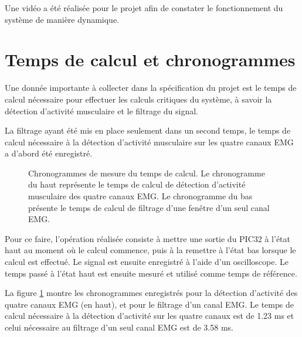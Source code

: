 \documentclass[letterpaper, twoside, 12pt, memoire, creativecommons, hyperref]{thETS}
\begin{document}
Une vidéo a été réalisée pour le projet afin de constater le fonctionnement du système de manière dynamique.

\section{Temps de calcul et chronogrammes}

Une donnée importante à collecter dans la spécification du projet est le temps de calcul nécessaire pour effectuer les calculs critiques du système, à savoir la détection d'activité musculaire et le filtrage du signal.

La filtrage ayant été mis en place seulement dans un second temps, le temps de calcul nécessaire à la détection d'activité musculaire sur les quatre canaux EMG a d'abord été enregistré. 

\begin{figure}
	\centering
	\caption{Chronogrammes de mesure du temps de calcul. Le chronogramme du haut représente le temps de calcul de détection d'activité musculaire des quatre canaux EMG. Le chronogramme du bas présente le temps de calcul de filtrage d'une fenêtre d'un seul canal EMG.}
	\label{fig:chronogrammes}
\end{figure}

Pour ce faire, l'opération réalisée consiste à mettre une sortie du PIC32 à l'état haut au moment où le calcul commence, puis à la remettre à l'état bas lorsque le calcul est effectué. Le signal est ensuite enregistré à l'aide d'un oscilloscope. Le temps passé à l'état haut est ensuite mesuré et utilisé comme temps de référence. 

La figure \ref{fig:chronogrammes} montre les chronogrammes enregistrés pour la détection d'activité des quatre canaux EMG (en haut), et pour le filtrage d'un canal EMG. Le temps de calcul nécessaire à la détection d'activité sur les quatre canaux est de 1.23 ms et celui nécessaire au filtrage d'un seul canal EMG est de 3.58 ms.
\end{document}
